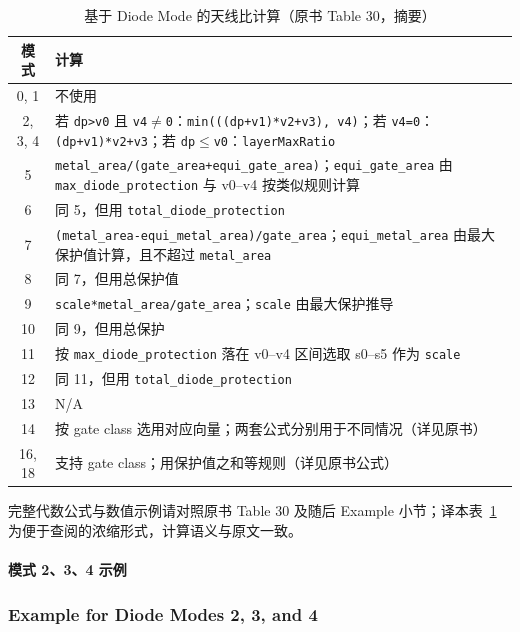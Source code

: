 \begin{table}[htbp]
\centering
\caption{基于 Diode Mode 的天线比计算（原书 Table 30，摘要）}
\label{tab:antenna-ratio-calc}
\begin{tabular}{@{}cp{}@{}}
\toprule
模式 & 计算 \\
\midrule
0, 1 & 不使用 \\
2, 3, 4 & 若 \texttt{dp>v0} 且 \texttt{v4$\neq$0}：\texttt{min(((dp+v1)*v2+v3), v4)}；若 \texttt{v4=0}：\texttt{(dp+v1)*v2+v3}；若 \texttt{dp$\leq$v0}：\texttt{layerMaxRatio} \\
5 & \texttt{metal\_area/(gate\_area+equi\_gate\_area)}；\texttt{equi\_gate\_area} 由 \texttt{max\_diode\_protection} 与 v0--v4 按类似规则计算 \\
6 & 同 5，但用 \texttt{total\_diode\_protection} \\
7 & \texttt{(metal\_area-equi\_metal\_area)/gate\_area}；\texttt{equi\_metal\_area} 由最大保护值计算，且不超过 \texttt{metal\_area} \\
8 & 同 7，但用总保护值 \\
9 & \texttt{scale*metal\_area/gate\_area}；\texttt{scale} 由最大保护推导 \\
10 & 同 9，但用总保护 \\
11 & 按 \texttt{max\_diode\_protection} 落在 v0--v4 区间选取 s0--s5 作为 \texttt{scale} \\
12 & 同 11，但用 \texttt{total\_diode\_protection} \\
13 & N/A \\
14 & 按 gate class 选用对应向量；两套公式分别用于不同情况（详见原书） \\
16, 18 & 支持 gate class；用保护值之和等规则（详见原书公式） \\
\bottomrule
\end{tabular}
\end{table}

\begin{noteBox}
完整代数公式与数值示例请对照原书 Table 30 及随后 Example 小节；译本表~\ref{tab:antenna-ratio-calc} 为便于查阅的浓缩形式，计算语义与原文一致。
\end{noteBox}

\paragraph{模式 2、3、4 示例}
\subsubsection*{Example for Diode Modes 2, 3, and 4}

